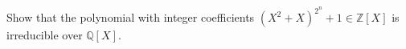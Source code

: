 \begin{problem}
    Show that the polynomial with integer coefficients \( \left(X^2+X\right)^{2^n}+1\in\mathbb{Z}\left[X\right] \) is irreducible over \( \mathbb{Q}\left[X\right] \).
\end{problem}
